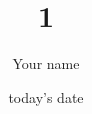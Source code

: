 \documentclass[12pt]{report}
\title{1}
\author{ Your name}
\date{today's date}
\makeatletter
\let\thetitle\@title
\makeatother
\begin{document}


%	
%            
%           
%	
%    
%    
%    
%    
%	


\tableofcontents
\pagebreak

\renewcommand{\thesection}{\arabic{section}}
 
% 
% 
% 
% 
% 
% 
% 
 
\end{document}
